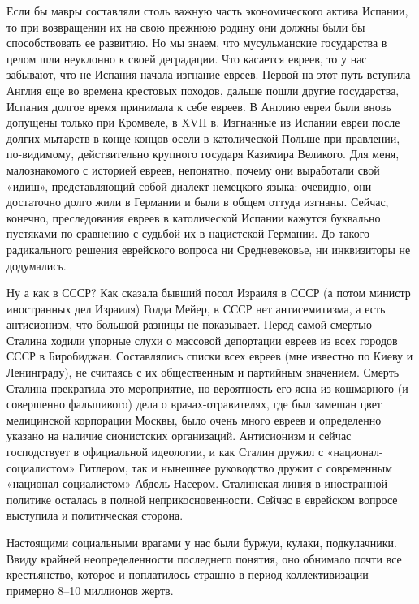 Если  бы мавры  составляли  столь важную  часть экономического  актива
Испании,  то при  возвращении их  на  свою прежнюю  родину они  должны
были бы  способствовать ее  развитию. Но  мы знаем,  что мусульманские
государства в  целом шли  неуклонно к  своей деградации.  Что касается
евреев,  то у  нас забывают,  что не  Испания начала  изгнание евреев.
Первой на этот путь вступила  Англия еще во времена крестовых походов,
дальше пошли другие государства, Испания долгое время принимала к себе
евреев. В Англию евреи были вновь допущены только при Кромвеле, в XVII
в. Изгнанные  из Испании  евреи после долгих  мытарств в  конце концов
осели в католической Польше  при правлении, по-видимому, действительно
крупного  государя  Казимира  Великого.   Для  меня,  малознакомого  с
историей  евреев,  непонятно,  почему   они  выработали  свой  «идиш»,
представляющий собой диалект немецкого языка: очевидно, они достаточно
долго  жили  в  Германии  и  были  в  общем  оттуда  изгнаны.  Сейчас,
конечно, преследования евреев в католической Испании кажутся буквально
пустяками  по  сравнению  с  судьбой  их  в  нацистской  Германии.  До
такого радикального  решения еврейского  вопроса ни  Средневековье, ни
инквизиторы не додумались.

Ну  а  как  в  СССР?  Как  сказала бывший  посол  Израиля  в  СССР  (а
потом  министр  иностранных  дел  Израиля) Голда  Мейер,  в  СССР  нет
антисемитизма, а есть антисионизм,  что большой разницы не показывает.
Перед  самой   смертью  Сталина   ходили  упорные  слухи   о  массовой
депортации  евреев из  всех  городов СССР  в Биробиджан.  Составлялись
списки  всех  евреев   (мне  известно  по  Киеву   и  Ленинграду),  не
считаясь  с  их общественным  и  партийным  значением. Смерть  Сталина
прекратила это мероприятие,  но вероятность его ясна  из кошмарного (и
совершенно  фальшивого) дела  о  врачах-отравителях,  где был  замешан
цвет  медицинской  корпорации  Москвы,   было  очень  много  евреев  и
определенно указано на наличие  сионистских организаций. Антисионизм и
сейчас господствует  в официальной  идеологии, и  как Сталин  дружил с
«национал-социалистом» Гитлером,  так и нынешнее руководство  дружит с
современным «национал-социалистом» Абдель-Насером.  Сталинская линия в
иностранной политике  осталась в  полной неприкосновенности.  Сейчас в
еврейском вопросе выступила и политическая сторона.

Настоящими   социальными   врагами   у  нас   были   буржуи,   кулаки,
подкулачники. Ввиду  крайней неопределенности последнего  понятия, оно
обнимало  почти  все крестьянство,  которое  и  поплатилось страшно  в
период коллективизации --- примерно 8--10 миллионов жертв.

